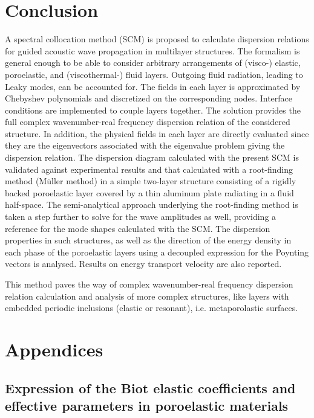 \section{Conclusion}
A spectral collocation method (SCM) is proposed to calculate dispersion relations for guided acoustic wave propagation {in multilayer structures}. The formalism is general enough to be able to consider arbitrary arrangements of (visco-) elastic, poroelastic, and (viscothermal-) fluid layers. Outgoing fluid radiation, leading to Leaky modes, can be accounted for. The fields in each layer is approximated by Chebyshev polynomials and discretized on the corresponding nodes. Interface conditions are implemented to couple layers together. The solution provides the full complex wavenumber-real frequency dispersion relation of the considered structure. In addition, the physical fields in each layer are directly evaluated since they are the eigenvectors associated with the eigenvalue problem giving the dispersion relation. The dispersion diagram calculated with the present SCM is validated against experimental results and that calculated with a root-finding method (M\"uller method) in a simple two-layer structure consisting of a rigidly backed poroelastic layer covered by a thin aluminum plate radiating in a fluid half-space. The semi-analytical approach underlying the root-finding method is taken a step further to solve for the wave amplitudes as well, providing a reference for the mode shapes calculated with the SCM.  The dispersion properties in such structures, as well as the direction of the energy density in each phase of the poroelastic layers using a decoupled expression for the Poynting vectors is analysed. Results on energy transport velocity are also reported. 

This method paves the way of complex wavenumber-real frequency dispersion relation calculation and analysis of more complex structures, like layers with embedded periodic inclusions (elastic or resonant), i.e. metaporolastic surfaces.      

\begingroup
\section{Appendices}
\renewcommand{\thesubsection}{\thesection.\Alph{subsection}}
\subsection{Expression of the Biot elastic coefficients and effective parameters in poroelastic materials} \label{app:coefs}

